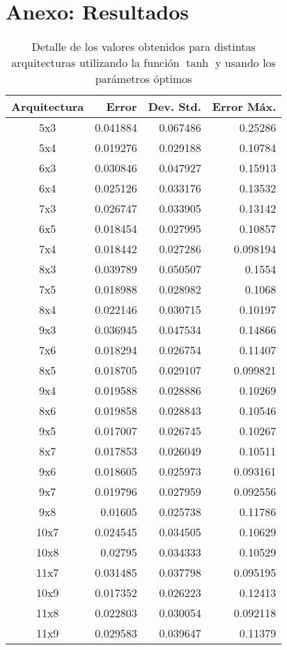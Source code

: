 \section*{Anexo: Resultados}

\begin{table}[H]
    \begin{tabular}{c|r|r|r}
        Arquitectura & Error & Dev. Std. & Error Máx.  \\
        \hline
        5x3 & 0.041884 & 0.067486 & 0.25286 \\
        5x4 & 0.019276 & 0.029188 & 0.10784 \\
        6x3 & 0.030846 & 0.047927 & 0.15913 \\
        6x4 & 0.025126 & 0.033176 & 0.13532 \\
        7x3 & 0.026747 & 0.033905 & 0.13142 \\
        6x5 & 0.018454 & 0.027995 & 0.10857 \\
        7x4 & 0.018442 & 0.027286 & 0.098194 \\
        8x3 & 0.039789 & 0.050507 & 0.1554 \\
        7x5 & 0.018988 & 0.028982 & 0.1068 \\
        8x4 & 0.022146 & 0.030715 & 0.10197 \\
        9x3 & 0.036945 & 0.047534 & 0.14866 \\
        7x6 & 0.018294 & 0.026754 & 0.11407 \\
        8x5 & 0.018705 & 0.029107 & 0.099821 \\
        9x4 & 0.019588 & 0.028886 & 0.10269 \\
        8x6 & 0.019858 & 0.028843 & 0.10546 \\
        9x5 & 0.017007 & 0.026745 & 0.10267 \\
        8x7 & 0.017853 & 0.026049 & 0.10511 \\
        9x6 & 0.018605 & 0.025973 & 0.093161 \\
        9x7 & 0.019796 & 0.027959 & 0.092556 \\
        9x8 & 0.01605 & 0.025738 & 0.11786 \\
        10x7 & 0.024545 & 0.034505 & 0.10629 \\
        10x8 & 0.02795 & 0.034333 & 0.10529 \\
        11x7 & 0.031485 & 0.037798 & 0.095195 \\
        10x9 & 0.017352 & 0.026223 & 0.12413 \\
        11x8 & 0.022803 & 0.030054 & 0.092118 \\
        11x9 & 0.029583 & 0.039647 & 0.11379 \\
    \end{tabular}

    \caption{Detalle de los valores obtenidos para distintas arquitecturas utilizando la función $\tanh$ y usando los parámetros óptimos}
    \label{tab:arquitectura_full}
 
\end{table}
